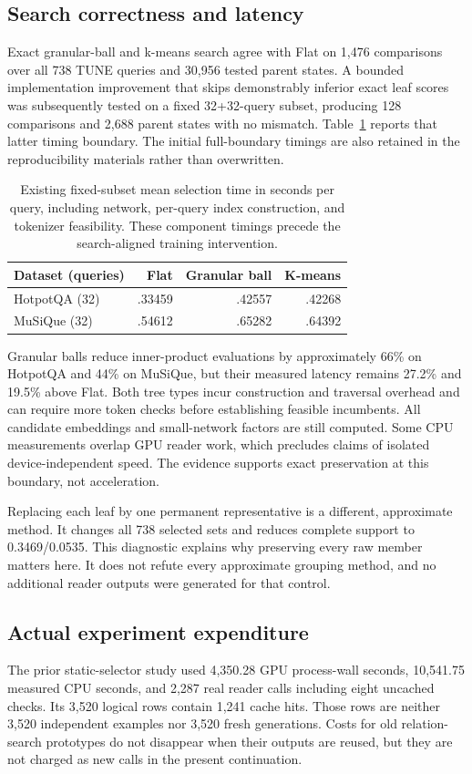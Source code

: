 \documentclass[pdflatex,sn-mathphys-num]{sn-jnl}
\begin{document}
\subsection{Search correctness and latency}\label{sec:cost}
Exact granular-ball and k-means search agree with Flat on 1,476 comparisons
over all 738 TUNE queries and 30,956 tested parent states. A bounded
implementation improvement that skips demonstrably inferior exact leaf
scores was subsequently tested on a fixed 32+32-query subset, producing
128 comparisons and 2,688 parent states with no mismatch. Table~\ref{tab:cost}
reports that latter timing boundary. The initial full-boundary timings are
also retained in the reproducibility materials rather than overwritten.

\begin{table}[t]\centering
\caption{Existing fixed-subset mean selection time in seconds per query,
including network, per-query index construction, and tokenizer feasibility.
These component timings precede the search-aligned training intervention.}
\label{tab:cost}
\begin{tabular}{lrrr}\toprule
Dataset (queries) & Flat & Granular ball & K-means\\\midrule
HotpotQA (32) & .33459 & .42557 & .42268\\
MuSiQue (32) & .54612 & .65282 & .64392\\\bottomrule
\end{tabular}
\end{table}

Granular balls reduce inner-product evaluations by approximately 66\% on
HotpotQA and 44\% on MuSiQue, but their measured latency remains 27.2\%
and 19.5\% above Flat. Both tree types incur construction and traversal
overhead and can require more token checks before establishing feasible
incumbents. All candidate embeddings and small-network factors are still
computed. Some CPU measurements overlap GPU reader work, which precludes
claims of isolated device-independent speed. The evidence supports exact
preservation at this boundary, not acceleration.

Replacing each leaf by one permanent representative is a different,
approximate method. It changes all 738 selected sets and reduces complete
support to 0.3469/0.0535. This diagnostic explains why preserving every raw
member matters here. It does not refute every approximate grouping method,
and no additional reader outputs were generated for that control.

\subsection{Actual experiment expenditure}

The prior static-selector study used 4,350.28 GPU process-wall seconds,
10,541.75 measured CPU seconds, and 2,287 real reader calls including eight
uncached checks. Its 3,520 logical rows contain 1,241 cache hits. Those rows
are neither 3,520 independent examples nor 3,520 fresh generations. Costs
for old relation-search prototypes do not disappear when their outputs are
reused, but they are not charged as new calls in the present continuation.
\end{document}

